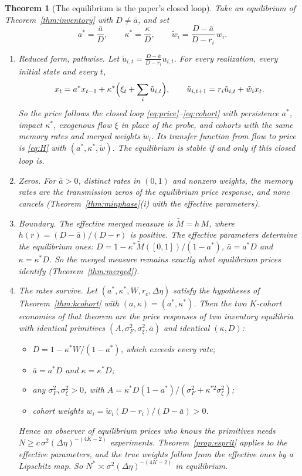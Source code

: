 \documentclass[12pt]{article}
\newtheorem{theorem}{Theorem}[section]
\theoremstyle{definition}
\theoremstyle{remark}
\begin{document}
\begin{theorem}[The equilibrium is the paper's closed loop]\label{thm:eqreduced}
Take an equilibrium of Theorem~\ref{thm:inventory} with $D\ne\bar a$, and set
\[
 a^*=\frac{\bar a}{D},\qquad \kappa^*=\frac{\kappa}{D},\qquad \tilde w_i=\frac{D-\bar a}{D-r_i}\,w_i .
\]
\begin{enumerate}[label=(\roman*),itemsep=1pt]
\item \emph{Reduced form, pathwise.} Let $\tilde u_{i,t}=\frac{D-\bar a}{D-r_i}u_{i,t}$. For every realization, every initial state and every $t$,
\[
 x_t=a^*x_{t-1}+\kappa^*\Bigl(\xi_t+\sum_i\tilde u_{i,t}\Bigr),\qquad \tilde u_{i,t+1}=r_i\tilde u_{i,t}+\tilde w_ix_t .
\]
So the price follows the closed loop \eqref{eq:price}--\eqref{eq:cohort} with persistence $a^*$, impact $\kappa^*$, exogenous flow $\xi$ in place of the probe, and cohorts with the same memory rates and merged weights $\tilde w_i$. Its transfer function from flow to price is \eqref{eq:H} with $(a^*,\kappa^*,\tilde w)$. The equilibrium is stable if and only if this closed loop is.
\item \emph{Zeros.} For $\bar a>0$, distinct rates in $(0,1)$ and nonzero weights, the memory rates are the transmission zeros of the equilibrium price response, and none cancels (Theorem~\ref{thm:minphase}(i) with the effective parameters).
\item \emph{Boundary.} The effective merged measure is $\tilde M=h\,M$, where $h(r)=(D-\bar a)/(D-r)$ is positive. The effective parameters determine the equilibrium ones: $D=1-\kappa^*\tilde M([0,1])/(1-a^*)$, $\bar a=a^*D$ and $\kappa=\kappa^*D$. So the merged measure remains exactly what equilibrium prices identify (Theorem~\ref{thm:merged}).
\item \emph{The rates survive.} Let $(a^*,\kappa^*,W,r_c,\Delta\eta)$ satisfy the hypotheses of Theorem~\ref{thm:kcohort} with $(a,\kappa)=(a^*,\kappa^*)$. Then the two $K$-cohort economies of that theorem are the price responses of two inventory equilibria with identical primitives $(A,\sigma_F^2,\sigma_\xi^2,\bar a)$ and identical $(\kappa,D)$:
 \begin{itemize}[itemsep=1pt,topsep=2pt]
 \item $D=1-\kappa^*W/(1-a^*)$, which exceeds every rate;
 \item $\bar a=a^*D$ and $\kappa=\kappa^*D$;
 \item any $\sigma_F^2,\sigma_\xi^2>0$, with $A=\kappa^*D(1-a^*)/(\sigma_F^2+\kappa^{*2}\sigma_\xi^2)$;
 \item cohort weights $w_i=\tilde w_i(D-r_i)/(D-\bar a)>0$.
 \end{itemize}
 Hence an observer of equilibrium prices who knows the primitives needs $N\ge c\,\sigma^2(\Delta\eta)^{-(4K-2)}$ experiments. Theorem~\ref{prop:esprit} applies to the effective parameters, and the true weights follow from the effective ones by a Lipschitz map. So $N^*\asymp\sigma^2(\Delta\eta)^{-(4K-2)}$ in equilibrium.
\end{enumerate}
\end{theorem}
\end{document}
